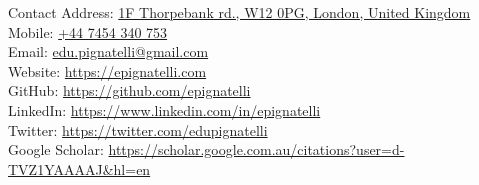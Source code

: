 \begin{rSection}{Contact}
    Address: \href{https://goo.gl/maps/Gwa9BTP2ARx}{1F Thorpebank rd., W12 0PG, London, United Kingdom} \\
    Mobile: \href{tel:07454340753}{+44 7454 340 753} \\
    Email:  \href{mailto:edu.pignatelli@gmail.com}{edu.pignatelli@gmail.com} \\
    Website: \href{https://epignatelli.com}{https://epignatelli.com} \\
    GitHub: \href{https://github.com/epignatelli}{https://github.com/epignatelli} \\
    LinkedIn: \href{https://www.linkedin.com/in/epignatelli}{https://www.linkedin.com/in/epignatelli} \\
    Twitter: \href{https://twitter.com/edupignatelli}{https://twitter.com/edupignatelli} \\
    Google Scholar: \href{https://scholar.google.com.au/citations?user=d-TVZ1YAAAAJ\&hl=en}{https://scholar.google.com.au/citations?user=d-TVZ1YAAAAJ\&hl=en}
\end{rSection}